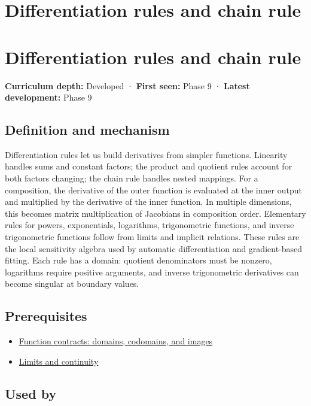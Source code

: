 \hypertarget{appendix-d9f70bdfbc92}{}
\section*{Differentiation rules and chain rule}
\section{Differentiation rules and chain rule}\label{differentiation-rules-and-chain-rule}

\textbf{Curriculum depth:} Developed · \textbf{First seen:} Phase 9 · \textbf{Latest development:} Phase 9

\subsection{Definition and mechanism}\label{definition-and-mechanism}

Differentiation rules let us build derivatives from simpler functions. Linearity handles sums and constant factors; the product and quotient rules account for both factors changing; the chain rule handles nested mappings. For a composition, the derivative of the outer function is evaluated at the inner output and multiplied by the derivative of the inner function. In multiple dimensions, this becomes matrix multiplication of Jacobians in composition order. Elementary rules for powers, exponentials, logarithms, trigonometric functions, and inverse trigonometric functions follow from limits and implicit relations. These rules are the local sensitivity algebra used by automatic differentiation and gradient-based fitting. Each rule has a domain: quotient denominators must be nonzero, logarithms require positive arguments, and inverse trigonometric derivatives can become singular at boundary values.

\subsection{Prerequisites}\label{prerequisites}

\begin{itemize}
\tightlist
\item
  \hyperref[appendix-a59658325cd6]{Function contracts: domains, codomains, and images}
\item
  \hyperref[appendix-fecc1847f5a3]{Limits and continuity}
\end{itemize}

\subsection{Used by}\label{used-by}

